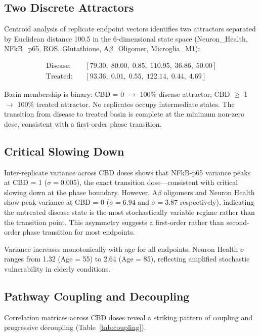 \documentclass[10pt,letterpaper]{article}
\begin{document}
\subsection{Two Discrete Attractors}

Centroid analysis of replicate endpoint vectors identifies two attractors separated by Euclidean distance 100.5 in the 6-dimensional state space (Neuron\_Health, NFkB\_p65, ROS, Glutathione, A$\beta$\_Oligomer, Microglia\_M1):

\begin{align}
\text{Disease:} \quad & [79.30, \; 80.00, \; 0.85, \; 110.95, \; 36.86, \; 50.00] \nonumber \\
\text{Treated:} \quad & [93.36, \; 0.01, \; 0.55, \; 122.14, \; 0.44, \; 4.69] \nonumber
\end{align}

Basin membership is binary: CBD = 0 $\to$ 100\% disease attractor; CBD $\geq$ 1 $\to$ 100\% treated attractor. No replicates occupy intermediate states. The transition from disease to treated basin is complete at the minimum non-zero dose, consistent with a first-order phase transition.

\subsection{Critical Slowing Down}

Inter-replicate variance across CBD doses shows that NFkB-p65 variance peaks at CBD = 1 ($\sigma = 0.005$), the exact transition dose---consistent with critical slowing down at the phase boundary. However, A$\beta$ oligomers and Neuron Health show peak variance at CBD = 0 ($\sigma = 6.94$ and $\sigma = 3.87$ respectively), indicating the untreated disease state is the most stochastically variable regime rather than the transition point. This asymmetry suggests a first-order rather than second-order phase transition for most endpoints.

Variance increases monotonically with age for all endpoints: Neuron Health $\sigma$ ranges from 1.32 (Age = 55) to 2.64 (Age = 85), reflecting amplified stochastic vulnerability in elderly conditions.

\subsection{Pathway Coupling and Decoupling}

Correlation matrices across CBD doses reveal a striking pattern of coupling and progressive decoupling (Table~\ref{tab:coupling}).
\end{document}
